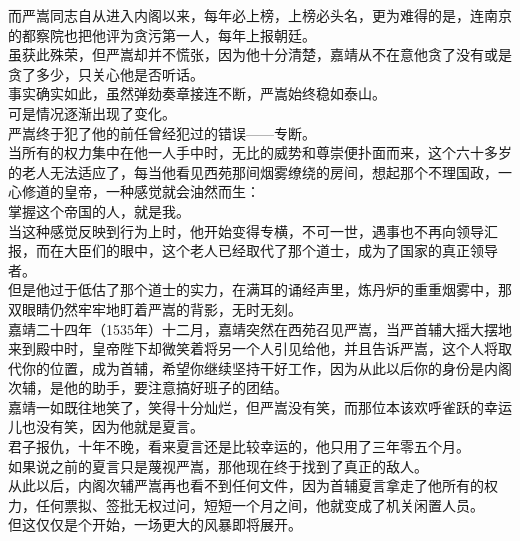 \begin{multicols}{\theparacolNo}
而严嵩同志自从进入内阁以来，每年必上榜，上榜必头名，更为难得的是，连南京的都察院也把他评为贪污第一人，每年上报朝廷。\\

虽获此殊荣，但严嵩却并不慌张，因为他十分清楚，嘉靖从不在意他贪了没有或是贪了多少，只关心他是否听话。\\

事实确实如此，虽然弹劾奏章接连不断，严嵩始终稳如泰山。\\

可是情况逐渐出现了变化。\\

严嵩终于犯了他的前任曾经犯过的错误——专断。\\

当所有的权力集中在他一人手中时，无比的威势和尊崇便扑面而来，这个六十多岁的老人无法适应了，每当他看见西苑那间烟雾缭绕的房间，想起那个不理国政，一心修道的皇帝，一种感觉就会油然而生：\\

掌握这个帝国的人，就是我。\\

当这种感觉反映到行为上时，他开始变得专横，不可一世，遇事也不再向领导汇报，而在大臣们的眼中，这个老人已经取代了那个道士，成为了国家的真正领导者。\\

但是他过于低估了那个道士的实力，在满耳的诵经声里，炼丹炉的重重烟雾中，那双眼睛仍然牢牢地盯着严嵩的背影，无时无刻。\\

嘉靖二十四年（1535年）十二月，嘉靖突然在西苑召见严嵩，当严首辅大摇大摆地来到殿中时，皇帝陛下却微笑着将另一个人引见给他，并且告诉严嵩，这个人将取代你的位置，成为首辅，希望你继续坚持干好工作，因为从此以后你的身份是内阁次辅，是他的助手，要注意搞好班子的团结。\\

嘉靖一如既往地笑了，笑得十分灿烂，但严嵩没有笑，而那位本该欢呼雀跃的幸运儿也没有笑，因为他就是夏言。\\

君子报仇，十年不晚，看来夏言还是比较幸运的，他只用了三年零五个月。\\

如果说之前的夏言只是蔑视严嵩，那他现在终于找到了真正的敌人。\\

从此以后，内阁次辅严嵩再也看不到任何文件，因为首辅夏言拿走了他所有的权力，任何票拟、签批无权过问，短短一个月之间，他就变成了机关闲置人员。\\

但这仅仅是个开始，一场更大的风暴即将展开。\\


\end{multicols}
